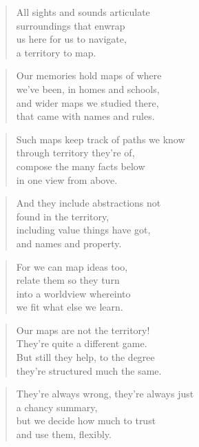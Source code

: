 \documentclass[10pt,a4paper]{article}
\begin{document}
\begin{multicols}{2}
\begin{verse}
All sights and sounds articulate\\
surroundings that enwrap\\
us here for us to navigate,\\
a territory to map.
\end{verse}

\begin{verse}
Our memories hold maps of where\\
we’ve been, in homes and schools,\\
and wider maps we studied there,\\
that came with names and rules.
\end{verse}

\begin{verse}
Such maps keep track of paths we know\\
through territory they’re of,\\
compose the many facts below\\
in one view from above.
\end{verse}

\begin{verse}
And they include abstractions not\\
found in the territory,\\
including value things have got,\\
and names and property.
\end{verse}

\begin{verse}
For we can map ideas too,\\
relate them so they turn\\
into a worldview whereinto\\
we fit what else we learn.
\end{verse}

\begin{verse}
Our maps are not the territory!\\
They’re quite a different game.\\
But still they help, to the degree\\
they’re structured much the same.
\end{verse}

\begin{verse}
They’re always wrong, they’re always just\\
a chancy summary,\\
but we decide how much to trust\\
and use them, flexibly.
\end{verse}


\end{multicols}
\end{document}
